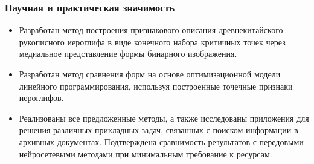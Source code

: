 \begin{frame}
    \frametitle{Научная и практическая значимость}
    \begin{itemize}
        \item Разработан метод построения признакового описания древнекитайского рукописного иероглифа в виде конечного набора критичных точек через медиальное представление формы бинарного изображения.
        \item Разработан метод сравнения форм на основе оптимизационной модели линейного программирования, используя построенные точечные признаки иероглифов.
        \item Реализованы все предложенные методы, а также исследованы приложения для решения различных прикладных задач, связанных с поиском информации в архивных документах. Подтверждена сравнимость результатов с передовыми нейросетевыми методами при минимальным требование к ресурсам.
    \end{itemize}
\end{frame}



